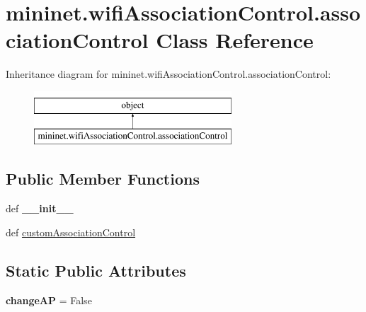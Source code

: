 \hypertarget{classmininet_1_1wifiAssociationControl_1_1associationControl}{\section{mininet.\-wifi\-Association\-Control.\-association\-Control Class Reference}
\label{classmininet_1_1wifiAssociationControl_1_1associationControl}
}
Inheritance diagram for mininet.\-wifi\-Association\-Control.\-association\-Control\-:\begin{figure}[H]
\begin{center}
\leavevmode
\includegraphics[height=2.000000cm]{classmininet_1_1wifiAssociationControl_1_1associationControl}
\end{center}
\end{figure}
\subsection*{Public Member Functions}
\begin{DoxyCompactItemize}
\item 
\hypertarget{classmininet_1_1wifiAssociationControl_1_1associationControl_ae0b486af6dc9b19651af1f0ac78c9351}{def {\bfseries \-\_\-\-\_\-init\-\_\-\-\_\-}}\label{classmininet_1_1wifiAssociationControl_1_1associationControl_ae0b486af6dc9b19651af1f0ac78c9351}

\item 
def \hyperlink{classmininet_1_1wifiAssociationControl_1_1associationControl_a816fb0f46f18bc39e4b25d6e22c95d39}{custom\-Association\-Control}
\end{DoxyCompactItemize}
\subsection*{Static Public Attributes}
\begin{DoxyCompactItemize}
\item 
\hypertarget{classmininet_1_1wifiAssociationControl_1_1associationControl_a93a998d27352625fcdd20034a57073be}{{\bfseries change\-A\-P} = False}\label{classmininet_1_1wifiAssociationControl_1_1associationControl_a93a998d27352625fcdd20034a57073be}

\end{DoxyCompactItemize}


